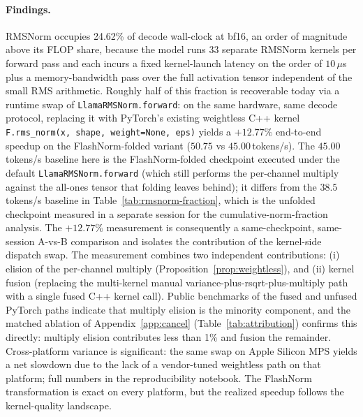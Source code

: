 \documentclass{article}
\begin{document}
\paragraph{Findings.} RMSNorm occupies 24.62\% of decode wall-clock at bf16, an order of magnitude above its FLOP share, because the model runs 33 separate RMSNorm kernels per forward pass and each incurs a fixed kernel-launch latency on the order of $10\,\mu$s plus a memory-bandwidth pass over the full activation tensor independent of the small RMS arithmetic. Roughly half of this fraction is recoverable today via a runtime swap of \texttt{LlamaRMSNorm.forward}: on the same hardware, same decode protocol, replacing it with PyTorch's existing weightless C++ kernel \texttt{F.rms\_norm(x, shape, weight=None, eps)} yields a $\mathbf{+12.77\%}$ end-to-end speedup on the FlashNorm-folded variant
($50.75$ vs $45.00$\,tokens/s).
The $45.00$\,tokens/s baseline here is the FlashNorm-folded checkpoint executed under the default \texttt{LlamaRMSNorm.forward} (which still performs the per-channel multiply against the all-ones tensor that folding leaves behind); it differs from the $38.5$\,tokens/s baseline in Table~\ref{tab:rmsnorm-fraction}, which is the unfolded checkpoint measured in a separate session for the cumulative-norm-fraction analysis. The $+12.77\%$ measurement is consequently a same-checkpoint, same-session A-vs-B comparison and isolates the contribution of the kernel-side dispatch swap. The measurement combines two independent contributions: (i) elision of the per-channel multiply (Proposition~\ref{prop:weightless}), and (ii) kernel fusion (replacing the multi-kernel manual variance-plus-rsqrt-plus-multiply path with a single fused C++ kernel call). Public benchmarks of the fused and unfused PyTorch paths indicate that multiply elision is the minority component, and the matched ablation of Appendix~\ref{app:cancel} (Table~\ref{tab:attribution}) confirms this directly: multiply elision contributes less than 1\% and fusion the remainder. Cross-platform variance is significant: the same swap on Apple Silicon MPS yields a net slowdown due to the lack of a vendor-tuned weightless path on that platform; full numbers in the reproducibility notebook. The FlashNorm transformation is exact on every platform, but the realized speedup follows the kernel-quality landscape.
\end{document}

